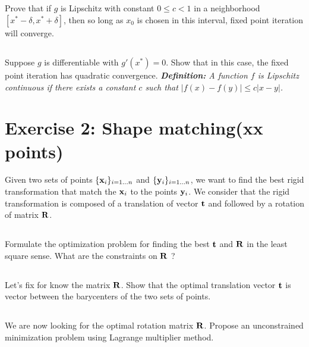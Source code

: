 \subsection{} Prove that if $g$ is Lipschitz with constant $0 \leq c < 1$ in a neighborhood $[x^* - \delta, x^* + \delta]$, then so long as $x_0$ is chosen in this interval, fixed point iteration will converge.

\subsection{} Suppose $g$ is differentiable with $g'(x^*) = 0$. Show that in this case, the fixed point iteration has quadratic convergence.\newline
\newline
\emph{\textbf{Definition:} A function $f$ is Lipschitz continuous if there exists a constant $c$ such that $|f(x) - f(y)| \leq c|x - y|$.} 

\begin{correction}
\end{correction}


\section*{Exercise 2: Shape matching\normalsize \textnormal(xx points)}

Given two sets of points $\{{\bf x}_i\}_{i = 1\hdots n}$ and $\{{\bf y}_i\}_{i = 1\hdots n}$, we want to find the best rigid transformation that match the ${\bf x}_i$ to the points ${\bf y}_i$. We consider that the rigid transformation is composed of a translation of vector ${\bf t}$ and followed by a rotation of matrix ${\bf R}$.

\subsection{} Formulate the optimization problem for finding the best ${\bf t}$ and ${\bf R}$ in the least square sense. What are the constraints on ${\bf R}$ ?

\subsection{} Let's fix for know the matrix ${\bf R}$. Show that the optimal translation vector ${\bf t}$ is vector between the barycenters of the two sets of points.

\subsection{} We are now looking for the optimal rotation matrix ${\bf R}$. Propose an unconstrained minimization problem using Lagrange multiplier method. 
